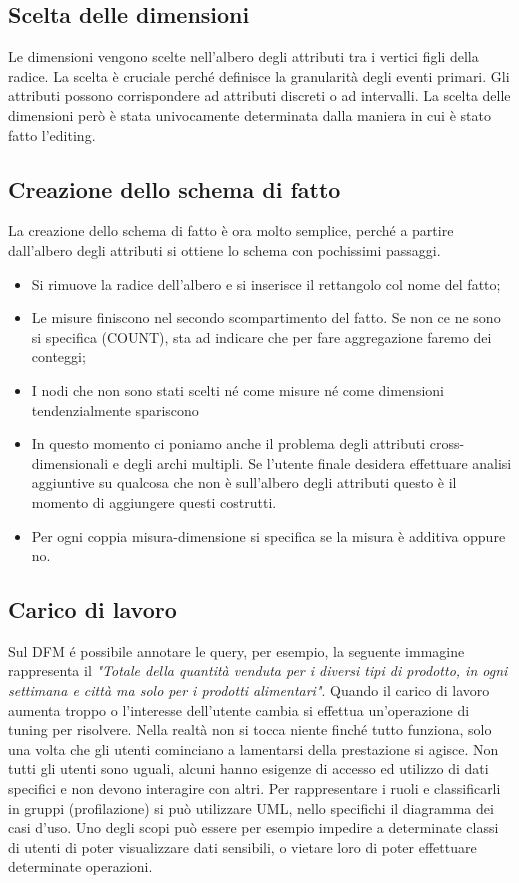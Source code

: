 \subsection{Scelta delle dimensioni}
Le dimensioni vengono scelte nell'albero degli attributi tra i vertici figli della radice. La scelta è cruciale perché definisce la granularità degli eventi primari. Gli attributi possono corrispondere ad attributi discreti o ad intervalli. La scelta delle dimensioni però è stata univocamente determinata dalla maniera in cui è stato fatto l'editing.
\subsection{Creazione dello schema di fatto}
La creazione dello schema di fatto è ora molto semplice, perché a partire dall'albero degli attributi si ottiene lo schema con pochissimi passaggi.
\begin{itemize}
	\item Si rimuove la radice dell'albero e si inserisce il rettangolo col nome del fatto;
	\item Le misure finiscono nel secondo scompartimento del fatto. Se non ce ne sono si specifica (COUNT), sta ad indicare che per fare aggregazione faremo dei conteggi;
	\item I nodi che non sono stati scelti né come misure né come dimensioni tendenzialmente spariscono
	\item In questo momento ci poniamo anche il problema degli attributi cross-dimensionali e degli archi multipli. Se l'utente finale desidera effettuare analisi aggiuntive su qualcosa che non è sull'albero degli attributi questo è il momento di aggiungere questi costrutti.
	\item Per ogni coppia misura-dimensione si specifica se la misura è additiva oppure no.
\end{itemize}
\subsection{Carico di lavoro}
Sul DFM é possibile annotare le query, per esempio, la seguente immagine rappresenta il \textit{"Totale della quantità venduta per i diversi tipi di prodotto, in ogni settimana e città ma solo per i prodotti alimentari"}.
\noindent Quando il carico di lavoro aumenta troppo o l'interesse dell'utente cambia si effettua un'operazione di tuning per risolvere. Nella realtà non si tocca niente finché tutto funziona, solo una volta che gli utenti cominciano a lamentarsi della prestazione si agisce.\newline
Non tutti gli utenti sono uguali, alcuni hanno esigenze di accesso ed utilizzo di dati specifici e non devono interagire con altri. Per rappresentare i ruoli e classificarli in gruppi (profilazione) si può utilizzare UML, nello specifichi il diagramma dei casi d'uso.\newline
Uno degli scopi può essere per esempio impedire a determinate classi di utenti di poter visualizzare dati sensibili, o vietare loro di poter effettuare determinate operazioni.

\newpage